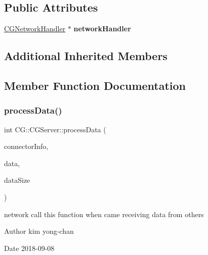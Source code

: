 \subsection*{Public Attributes}
\begin{DoxyCompactItemize}
\item 
\mbox{\label{class_c_g_1_1_c_g_server_a502226ceaa105fa3c3046391ee71742f}} 
\mbox{\hyperlink{class_c_g_1_1_c_g_network_handler}{C\+G\+Network\+Handler}} $\ast$ {\bfseries network\+Handler}
\end{DoxyCompactItemize}
\subsection*{Additional Inherited Members}


\subsection{Member Function Documentation}
\mbox{\label{class_c_g_1_1_c_g_server_a12598a365b61be0b9d7169a7d1aded49}} 
\subsubsection{\texorpdfstring{process\+Data()}{processData()}}
{\footnotesize\ttfamily int C\+G\+::\+C\+G\+Server\+::process\+Data (\begin{DoxyParamCaption}\item[{\mbox{\hyperlink{class_c_g_1_1_connector_info}{Connector\+Info}} $\ast$}]{connector\+Info,  }\item[{char $\ast$}]{data,  }\item[{int}]{data\+Size }\end{DoxyParamCaption})\hspace{0.3cm}{\ttfamily [virtual]}}



network call this function when came receiving data from others 

\begin{DoxyAuthor}{Author}
kim yong-\/chan 
\end{DoxyAuthor}
\begin{DoxyDate}{Date}
2018-\/09-\/08 
\end{DoxyDate}


